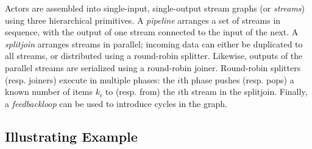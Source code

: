 \documentclass{sig-alternate}
\begin{document}
Actors are assembled into single-input, single-output stream graphs
(or {\it streams}) using three hierarchical primitives.  A {\it
pipeline} arranges a set of streams in sequence, with the output of
one stream connected to the input of the next.  A {\it splitjoin}
arranges streams in parallel; incoming data can either be duplicated
to all streams, or distributed using a round-robin splitter.
Likewise, outputs of the parallel streams are serialized using a
round-robin joiner.  Round-robin splitters (resp. joiners) execute in
multiple phases: the $i$th phase pushes (resp. pops) a known number of
items $k_i$ to (resp. from) the $i$th stream in the splitjoin.
Finally, a {\it feedbackloop} can be used to introduce cycles in the
graph.

\subsection{Illustrating Example}
\end{document}
